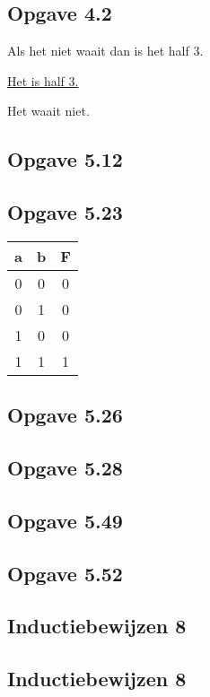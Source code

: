 \documentclass[11pt]{article}
\begin{document}
%

\subsection*{Opgave 4.2}

Als het niet waait dan is het half 3.

\underline{Het is half 3.\quad}

Het waait niet.


\subsection*{Opgave 5.12}



\subsection*{Opgave 5.23}

\begin{tabular}{cc|c}
a & b & F \\
\hline
0 & 0 & 0 \\
0 & 1 & 0 \\
1 & 0 & 0 \\
1 & 1 & 1 \\
\end{tabular}

\subsection*{Opgave 5.26}
\subsection*{Opgave 5.28}
\subsection*{Opgave 5.49}
\subsection*{Opgave 5.52}
\subsection*{Inductiebewijzen 8}
\subsection*{Inductiebewijzen 8}


\end{document}
